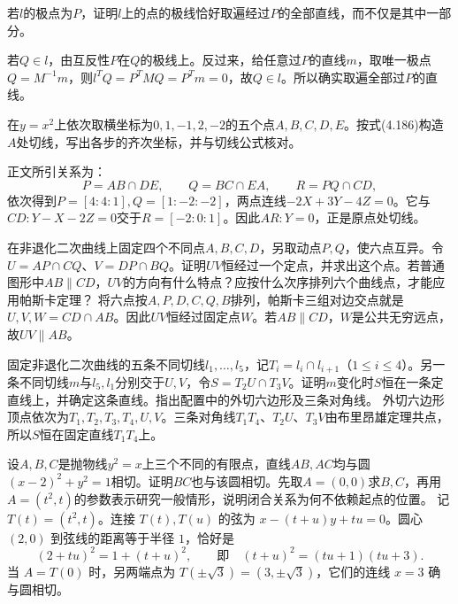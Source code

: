 若\(l\)的极点为\(P\)，证明\(l\)上的点的极线恰好取遍经过\(P\)的全部直线，而不仅是其中一部分。
\par
\solutionanswer
若\(Q\in l\)，由互反性\(P\)在\(Q\)的极线上。反过来，给任意过\(P\)的直线\(m\)，取唯一极点\(Q=M^{-1}m\)，则\(l^TQ=P^TMQ=P^Tm=0\)，故\(Q\in l\)。所以确实取遍全部过\(P\)的直线。


在\(y=x^2\)上依次取横坐标为\(0,1,-1,2,-2\)的五个点\(A,B,C,D,E\)。按式\textup{(4.186)}构造\(A\)处切线，写出各步的齐次坐标，并与切线公式核对。

\par\smallskip\noindent 正文所引关系为：
\begin{equation*}
P=AB\cap DE,\qquad Q=BC\cap EA,\qquad R=PQ\cap CD,
\end{equation*}
\solutionanswer
依次得到\(P=[4:4:1],Q=[1:-2:-2]\)，两点连线\(-2X+3Y-4Z=0\)。它与\(CD:Y-X-2Z=0\)交于\(R=[-2:0:1]\)。因此\(AR:Y=0\)，正是原点处切线。


在非退化二次曲线上固定四个不同点\(A,B,C,D\)，另取动点\(P,Q\)，使六点互异。令\(U=AP\cap CQ\)、\(V=DP\cap BQ\)。证明\(UV\)恒经过一个定点，并求出这个点。若普通图形中\(AB\parallel CD\)，\(UV\)的方向有什么特点？应按什么次序排列六个曲线点，才能应用帕斯卡定理？
\solutionanswer
将六点按\(A,P,D,C,Q,B\)排列，帕斯卡三组对边交点就是\(U,V,W=CD\cap AB\)。因此\(UV\)恒经过固定点\(W\)。若\(AB\parallel CD\)，\(W\)是公共无穷远点，故\(UV\parallel AB\)。


固定非退化二次曲线的五条不同切线\(l_1,\ldots,l_5\)，记\(T_i=l_i\cap l_{i+1}\)（\(1\le i\le4\)）。另一条不同切线\(m\)与\(l_5,l_1\)分别交于\(U,V\)，令\(S=T_2U\cap T_3V\)。证明\(m\)变化时\(S\)恒在一条定直线上，并确定这条直线。指出配置中的外切六边形及三条对角线。
\solutionanswer
外切六边形顶点依次为\(T_1,T_2,T_3,T_4,U,V\)。三条对角线\(T_1T_4\)、\(T_2U\)、\(T_3V\)由布里昂雄定理共点，所以\(S\)恒在固定直线\(T_1T_4\)上。


设\(A,B,C\)是抛物线\(y^2=x\)上三个不同的有限点，直线\(AB,AC\)均与圆\((x-2)^2+y^2=1\)相切。证明\(BC\)也与该圆相切。先取\(A=(0,0)\)求\(B,C\)，再用\(A=(t^2,t)\)的参数表示研究一般情形，说明闭合关系为何不依赖起点的位置。
\solutionanswer
记 \(T(t)=(t^2,t)\)。连接 \(T(t),T(u)\) 的弦为 \(x-(t+u)y+tu=0\)。圆心 \((2,0)\) 到弦线的距离等于半径 \(1\)，恰好是
\[
 (2+tu)^2=1+(t+u)^2,\qquad\text{即}\quad (t+u)^2=(tu+1)(tu+3).
\]
当 \(A=T(0)\) 时，另两端点为 \(T(\pm\sqrt3)=(3,\pm\sqrt3)\)，它们的连线 \(x=3\) 确与圆相切。

